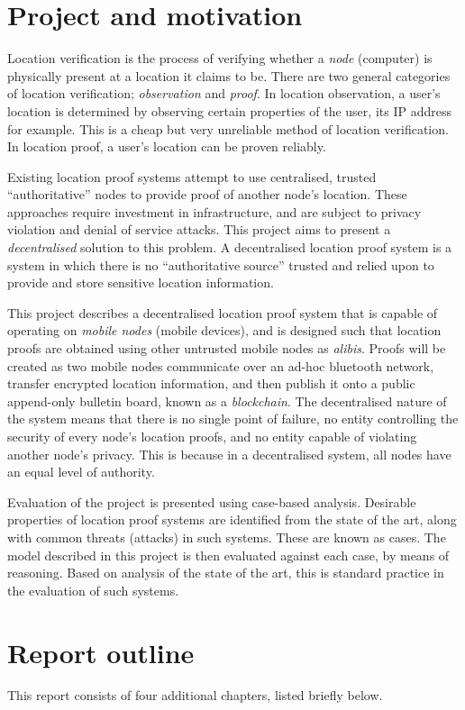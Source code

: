 \section{Project and motivation}
Location verification is the process of verifying whether a \textit{node} (computer) is physically present at a location it claims to be. There are two general categories of location verification; \textit{observation} and \textit{proof}. In location observation, a user's location is determined by observing certain properties of the user, its IP address for example. This is a cheap but very unreliable method of location verification. In location proof, a user's location can be proven reliably.

Existing location proof systems attempt to use centralised, trusted ``authoritative'' nodes to provide proof of another node's location. These approaches require investment in infrastructure, and are subject to privacy violation and denial of service attacks. This project aims to present a \textit{decentralised} solution to this problem. A decentralised location proof system is a system in which there is no ``authoritative source'' trusted and relied upon to provide and store sensitive location information.

This project describes a decentralised location proof system that is capable of operating on \textit{mobile nodes} (mobile devices), and is designed such that location proofs are obtained using other untrusted mobile nodes as \textit{alibis}. Proofs will be created as two mobile nodes communicate over an ad-hoc bluetooth network, transfer encrypted location information, and then publish it onto a public append-only bulletin board, known as a \textit{blockchain}. The decentralised nature of the system means that there is no single point of failure, no entity controlling the security of every node's location proofs, and no entity capable of violating another node's privacy. This is because in a decentralised system, all nodes have an equal level of authority.

Evaluation of the project is presented using case-based analysis. Desirable properties of location proof systems are identified from the state of the art, along with common threats (attacks) in such systems. These are known as cases. The model described in this project is then evaluated against each case, by means of reasoning. Based on analysis of the state of the art, this is standard practice in the evaluation of such systems.

\section{Report outline}
This report consists of four additional chapters, listed briefly below.

